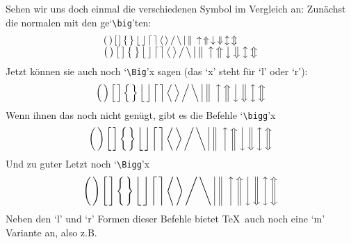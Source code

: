 Sehen wir uns doch einmal die verschiedenen Symbol im Vergleich an:
Zun\"achst die normalen mit den 
ge`\verb|\big|'ten:
\[\begin{array}{l}
(\,)\,[\,]\,\{\,\}\,\lfloor\,\rfloor\,\lceil\,\rceil\,\langle\,\rangle
\,/\,\backslash\,\vert\,\Vert\,\uparrow\,\Uparrow\,\downarrow\,\Downarrow
\,\updownarrow\,\Updownarrow\\
\bigl(\,\bigr)\,\bigl[\,\bigr]\,\bigl\{\,\bigr\}\,\bigl\lfloor
\,\bigr\rfloor\,\bigl\lceil\,\bigr\rceil\,\bigl\langle\,\bigr\rangle
\,\big/\,\big\backslash\,\big\vert\,\big\Vert\,\bigm\uparrow\,\bigm\Uparrow
\,\bigm\downarrow\,\bigm\Downarrow\,\bigm\updownarrow\,\bigm\Updownarrow
\end{array}\]
Jetzt k\"onnen sie auch noch `\verb|\Big|'x sagen (das `x' steht f\"ur `l'
oder `r'):
\[\Bigl(\,\Bigr)\,\Bigl[\,\Bigr]\,\Bigl\{\,\Bigr\}\,\Bigl\lfloor
\,\Bigr\rfloor\,\Bigl\lceil\,\Bigr\rceil\,\Bigl\langle\,\Bigr\rangle
\,\Big/\,\Big\backslash\,\Big\vert\,\Big\Vert\,\Bigm\uparrow\,\Bigm\Uparrow
\,\Bigm\downarrow\,\Bigm\Downarrow\,\Bigm\updownarrow\,\Bigm\Updownarrow\]
Wenn ihnen das noch nicht gen\"ugt, gibt es die Befehle
`\verb|\bigg|'x
\[\biggl(\,\biggr)\,\biggl[\,\biggr]\,\biggl\{\,\biggr\}\,\biggl\lfloor
\,\biggr\rfloor\,\biggl\lceil\,\biggr\rceil\,\biggl\langle\,\biggr\rangle
\,\bigg/\,\bigg\backslash\,\bigg\vert\,\bigg\Vert\,\biggm\uparrow
\,\biggm\Uparrow\,\biggm\downarrow\,\biggm\Downarrow\,\biggm\updownarrow
\,\biggm\Updownarrow\]
Und zu guter Letzt noch `\verb|\Bigg|'x
\[\Biggl(\,\Biggr)\,\Biggl[\,\Biggr]\,\Biggl\{\,\Biggr\}\,\Biggl\lfloor
\,\Biggr\rfloor\,\Biggl\lceil\,\Biggr\rceil\,\Biggl\langle\,\Biggr\rangle
\,\Bigg/\,\Bigg\backslash\,\Bigg\vert\,\Bigg\Vert\,\Biggm\uparrow
\,\Biggm\Uparrow\,\Biggm\downarrow\,\Biggm\Downarrow\,\Biggm\updownarrow
\,\Biggm\Updownarrow\]
Neben den `l' und `r' Formen dieser Befehle bietet \TeX\ auch noch
eine `m' Variante an, also z.B.\ 
